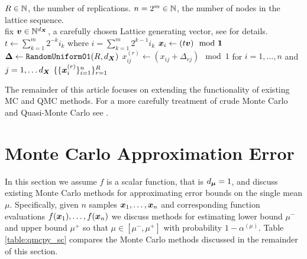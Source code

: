 \documentclass{article}[12pt]
\begin{document}
\begin{algorithm}[h!]
    \caption{$\texttt{Gen.Lattice}(R,n)$}
    \label{algo:Gen.Lattice}
    \begin{algorithmic}
    \Require $R \in \mathbb{N}$, the number of replications.
    \Require $n = 2^m \in \mathbb{N}$, the number of nodes in the lattice sequence.
    \\ \hrulefill
    \State fix $\boldsymbol{v} \in \mathbb{N}^{d_{\boldsymbol{X}}}$, a carefully chosen Lattice generating vector, see  for details. 
        \State $t \gets \sum_{k=1}^m 2^{-k}i_k$ where $i = \sum_{k=1}^m 2^{k-1} i_k$ 
        \State $\boldsymbol{x}_i \gets (t\boldsymbol{v}) \mod \boldsymbol{1}$
    \EndFor
    \State $\boldsymbol{\Delta} \gets \texttt{RandomUniform01}(R,d_{\boldsymbol{X}})$ 
        \State $x_{ij}^{(r)} \gets (x_{ij}+\Delta_{rj}) \mod 1$ for $i=1,\dots,n$ and $j=1,\dots d_{\boldsymbol{X}}$
    \EndFor
    \State \Return $\{\{\boldsymbol{x}_i^{(r)}\}_{i=1}^n\}_{r=1}^R$
    \end{algorithmic}
\end{algorithm}
    
The remainder of this article focuses on extending the functionality of existing MC and QMC methods. For a more carefully treatment of crude Monte Carlo and Quasi-Monte Carlo see \cite{mcbook}. 

\section{Monte Carlo Approximation Error}\label{sec:Existing_QMC_Methods}

In this section we assume $f$ is a scalar function, that is $d_{\boldsymbol{\mu}}=1$, and discuss existing Monte Carlo methods for approximating error bounds on the single mean $\mu$. Specifically, given $n$ samples $\boldsymbol{x}_1,\dots,\boldsymbol{x}_n$ and  corresponding function evaluations $f(\boldsymbol{x}_1),\dots,f(\boldsymbol{x}_n)$ we discuss methods for estimating lower bound $\mu^-$ and upper bound $\mu^+$ so that $\mu \in [\mu^-,\mu^+]$ with probability $1-\alpha^{(\mu)}$. Table \ref{table:qmcpy_sc} compares the Monte Carlo methods discussed in the remainder of this section.
\end{document}
